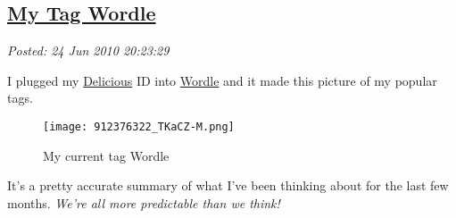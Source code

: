 %

\subsection*{\href{http://bakerjd99.wordpress.com/2010/06/24/my-tag-wordle/}{My Tag Wordle}}


\noindent\emph{Posted: 24 Jun 2010 20:23:29}
\vspace{6pt}

I plugged my \href{http://delicious.com/}{Delicious} ID into
\href{http://www.wordle.net/create}{Wordle} and it made this picture of
my popular tags.


\captionsetup[figure]{labelformat=empty}
\begin{figure}[htbp]
\centering
\texttt{[image: 912376322\_TKaCZ-M.png]}
\caption{My  current tag  Wordle}
\label{fig:640X0}
\end{figure}


It's a pretty accurate summary of what I've been thinking about for the
last few months. \emph{We're all more predictable than we think!}




%
